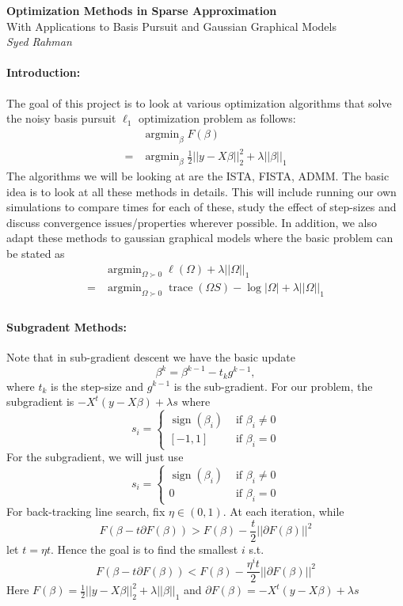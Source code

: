 \documentclass[12pt, leqno]{article}
\newcommand{\norm}[1]{\left|\left|#1\right|\right|}
\newcommand{\abs}[1]{\left|#1\right|}
\DeclareMathOperator*{\sign}{sign}
\DeclareMathOperator*{\trace}{trace}
\DeclareMathOperator*{\argmin}{argmin}
\theoremstyle{remark}
\begin{document}
\pagestyle{fancy}

\begin{center}
{\large {\bf Optimization Methods in Sparse Approximation}} \\
{ {With Applications to Basis Pursuit and Gaussian Graphical Models}} \\
{{\it Syed Rahman}} \\
\end{center}

\paragraph{Introduction:} The goal of this project is to look at various
optimization algorithms that solve the noisy basis pursuit $\ell_1$ optimization
problem as follows:
\begin{align}
\label{eq:lasso}
& \argmin_{\beta} F(\beta) \\ 
\nonumber 
=& \argmin_{\beta} \frac{1}{2}\norm{y- X \beta}_2^2 + \lambda \norm{\beta}_1
\end{align}
The algorithms we will be looking at are the ISTA, FISTA, ADMM. The
basic idea is to look at all these methods in details. This will include running our own simulations to compare times
for each of these, study the effect of step-sizes and discuss convergence issues/properties wherever possible. In addition, we also adapt these methods to gaussian graphical models where the basic problem can be stated as
\begin{align*}
\label{eq:glasso}
&\argmin_{\Omega \succ 0} \ell(\Omega) + \lambda \norm{\Omega}_1 \\
=&\argmin_{\Omega \succ 0} \trace(\Omega S) - \log \abs{\Omega} + \lambda \norm{\Omega}_1 \\
\end{align*}


\paragraph{Subgradent Methods:} Note that in  sub-gradient descent we have the basic update $$\beta^k = \beta^{k-1} - t_k g^{k-1},$$ 
where $t_k$ is the step-size and $g^{k-1}$ is the sub-gradient. For our problem, the subgradient is $-X^t(y-X\beta) + \lambda s$ where 
$$
s_i = \begin{cases}
\sign(\beta_i) &\text{ if } \beta_i \neq 0\\
[-1,1] &\text{ if } \beta_i = 0
\end{cases}
$$
For the subgradient, we will just use
$$
s_i = \begin{cases}
\sign(\beta_i) &\text{ if } \beta_i \neq 0\\
0 &\text{ if } \beta_i = 0
\end{cases}
$$
For back-tracking line search, fix $\eta \in (0,1)$. At each iteration, while 
$$
F(\beta - t \partial F(\beta)) > F(\beta) - \frac{t}{2} \norm{\partial F(\beta)}^2
$$
let $t = \eta t$. Hence the goal is to find the smallest $i$ s.t. $$
F(\beta - t \partial F(\beta)) < F(\beta) - \frac{\eta^i t}{2} \norm{\partial F(\beta)}^2
$$ 
Here $F(\beta) = \frac{1}{2}\norm{y- X \beta}_2^2 + \lambda \norm{\beta}_1$ and $\partial F(\beta) = -X^t(y-X\beta) + \lambda s$
\end{document}
